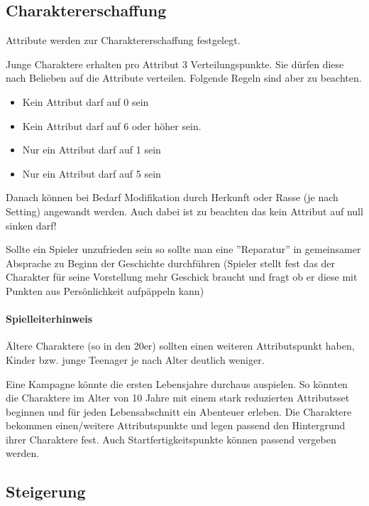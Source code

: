 \documentclass{article}
\begin{document}
\begin{center}
\subsection{Charaktererschaffung}
\end{center}

Attribute werden zur Charaktererschaffung festgelegt.

Junge Charaktere erhalten pro Attribut 3 Verteilungspunkte. Sie dürfen diese
nach Belieben auf die Attribute verteilen. Folgende Regeln sind aber zu beachten.

\begin{itemize}
\item Kein Attribut darf auf 0 sein
\item Kein Attribut darf auf 6 oder höher sein.
\item Nur ein Attribut darf auf 1 sein
\item Nur ein Attribut darf auf 5 sein
\end{itemize}

Danach können bei Bedarf Modifikation durch Herkunft oder Rasse (je nach Setting) angewandt werden. Auch dabei ist zu
beachten das kein Attribut auf null sinken darf!

Sollte ein Spieler unzufrieden sein so sollte man eine ''Reparatur'' in gemeinsamer Absprache zu Beginn der Geschichte
durchführen (Spieler stellt fest das der Charakter für seine Vorstellung mehr Geschick braucht und fragt ob er diese
mit Punkten aus Persönlichkeit aufpäppeln kann)

\begin{mdframed}[hidealllines=true, backgroundcolor=black!10]
\paragraph{Spielleiterhinweis}

Ältere Charaktere (so in den 20er) sollten einen weiteren Attributspunkt haben, Kinder bzw. junge Teenager je nach
Alter deutlich weniger.

Eine Kampagne könnte die ersten Lebensjahre durchaus auspielen. So könnten die Charaktere im Alter von 10 Jahre
mit einem stark reduzierten Attributsset beginnen und für jeden Lebensabschnitt ein Abenteuer erleben. Die Charaktere
bekommen einen/weitere Attributspunkte und legen passend den Hintergrund ihrer Charaktere fest.
Auch Startfertigkeitspunkte können passend vergeben werden.

\end{mdframed}
\begin{center}
\subsection{Steigerung}
\end{center}
\end{document}
